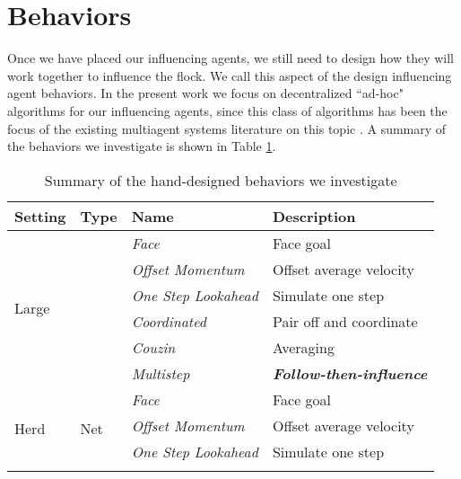 \section{Behaviors}
Once we have placed our influencing agents, we still need to design how they
will work together to influence the flock.
We call this aspect of the design influencing agent behaviors.
In the present work we focus on decentralized ``ad-hoc" algorithms for our
influencing agents, since this class of algorithms has been the focus of the
existing multiagent systems literature on this topic
\cite{genterthesis, genter2014neighborsorientherd, genter201612steplookahead}.
A summary of the behaviors we investigate is shown in Table
\ref{table:behaviors}.

\begin{table}[]
\footnotesize
\centering
\caption{Summary of the hand-designed behaviors we investigate}
\label{table:behaviors}
\begin{tabular}{|l|l|l|l|}
\hline
\textbf{Setting}       & \textbf{Type}               & \textbf{Name}        & \textbf{Description}                    \\ \hline
\multirow{6}{*}{Large} & \multirow{3}{*}{\textbf{}}  & \textit{Face}      & Face goal        \\ \cline{3-4}
                       &                             & \textit{Offset Momentum}      & Offset average velocity      \\ \cline{3-4}
                       &                             & \textit{One Step Lookahead}  & Simulate one step      \\ \cline{3-4}
                       &                             & \textit{Coordinated}      & Pair off and coordinate      \\ \cline{3-4}
                       &                             & \textit{Couzin}      & Averaging       \\ \cline{3-4}
                       &                             & \textit{Multistep}   & \textit{\textbf{Follow-then-influence}} \\ \hline
        \multirow{8}{*}{Herd}  & \multirow{5}{*}{Net} & \textit{Face}      & Face goal        \\ \cline{3-4}
                       &                             & \textit{Offset Momentum}      & Offset average velocity      \\ \cline{3-4}
                       &                             & \textit{One Step Lookahead}  & Simulate one step      \\ \cline{3-4}

\end{tabular}
\end{table}
